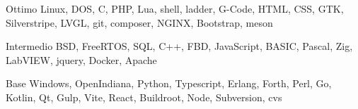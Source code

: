 \documentclass[fontsize=10pt]{tccv}
\begin{document}
\begin{factlist}

\item{Ottimo}
     {Linux, DOS, C, PHP, Lua, shell, ladder, G-Code, HTML, CSS,
      GTK, Silverstripe, LVGL, git, composer, NGINX, Bootstrap, meson}

\item{Intermedio}
     {BSD, FreeRTOS, SQL, C++, FBD, JavaScript, BASIC, Pascal, Zig,
      LabVIEW, jquery, Docker, Apache}

\item{Base}
    {Windows, OpenIndiana, Python, Typescript, Erlang, Forth, Perl, Go,
     Kotlin, Qt, Gulp, Vite, React, Buildroot, Node, Subversion, cvs}

\end{factlist}
\end{document}
